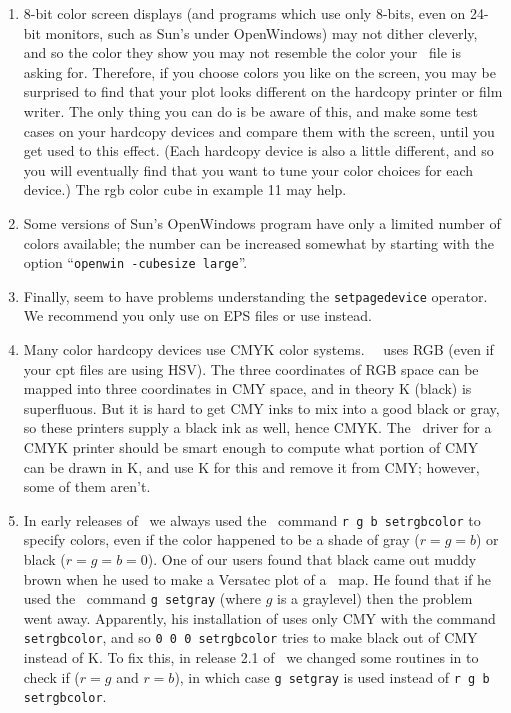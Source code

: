 \begin{enumerate}

\item 8-bit color screen displays (and programs which use only
8-bits, even on 24-bit monitors, such as Sun's  under
OpenWindows) may not dither cleverly, and so the color they show you
may not resemble the color your \PS\ file is asking
for.  Therefore, if you choose colors you like on the screen,
you may be surprised to find that your plot looks different on
the hardcopy printer or film writer.  The only thing you can
do is be aware of this, and make some test cases on your hardcopy
devices and compare them with the screen, until you get used
to this effect.  (Each hardcopy device is also a little
different, and so you will eventually find that you want to
tune your color choices for each device.)  The rgb color cube
in example 11 may help.

\item Some versions of Sun's OpenWindows program 
have only a limited number of colors available; the number
can be increased somewhat by starting  with the
option ``\texttt{openwin -cubesize large}''.

\item Finally,  seem to have problems understanding
the \texttt{setpagedevice} operator.  We recommend you only use
 on EPS files or use  instead.


\item Many color hardcopy devices use CMYK color systems. \GMT\
\PS\ uses RGB (even if your cpt files are using HSV).
The three coordinates of RGB space can be mapped into three
coordinates in CMY space, and in theory K (black) is superfluous.
But it is hard to get CMY inks to mix into a good black or gray,
so these printers supply a black ink as well, hence CMYK.  The
\PS\ driver for a CMYK printer should be smart
enough to compute what portion of CMY can be drawn in K, and
use K for this and remove it from CMY; however, some of them
aren't.

\item In early releases of \GMT\ we always used the \PS\
command \texttt{r g b setrgbcolor} to specify colors, even if the color
happened to be a shade of gray ($r=g=b$) or black ($r=g=b=0$).  One
of our users found that black came out muddy brown when he used
\progname{FreedomOfPress} to make a Versatec plot of a \GMT\ map.
He found that if he used the \PS\ command \texttt{g setgray} (where $g$
is a graylevel) then the problem went away.
Apparently, his installation of \progname{FreedomOfPress} uses only CMY with
the command \texttt{setrgbcolor}, and so \texttt{0 0 0 setrgbcolor}
tries to make black out of CMY instead of K.  To fix this, in
release 2.1 of \GMT\ we changed some routines in \filename{pslib.c}
to check if ($r=g$ and $r=b$), in which case \texttt{g setgray} is
used instead of \texttt{r g b setrgbcolor}.


\end{enumerate}
